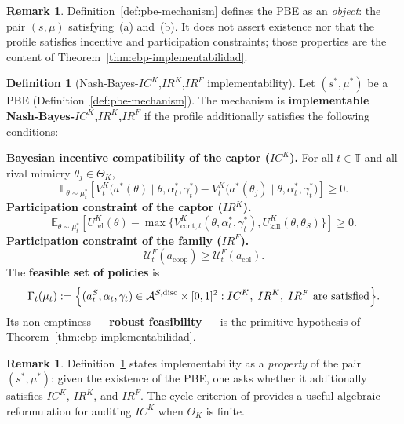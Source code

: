 \documentclass[ecta,nameyear,final,supplement]{econsocart}
\numberwithin{equation}{section}
\numberwithin{table}{section}
\theoremstyle{definition}
\newtheorem{definition}[theorem]{Definition}
\newtheorem{remark}[theorem]{Remark}
\begin{document}
\begin{remark}
Definition~\ref{def:pbe-mechanism} defines the PBE as an \emph{object}: the
pair $(s,\mu)$ satisfying~(a) and~(b). It does not assert existence nor that the
profile satisfies incentive and participation constraints; those properties are
the content of Theorem~\ref{thm:ebp-implementabilidad}.
\end{remark}

\bigskip

\begin{definition}[Nash-Bayes-$IC^K$,$IR^K$,$IR^F$ implementability]
\label{def:implementable-mechanism}
Let $(s^\ast,\mu^\ast)$ be a PBE (Definition~\ref{def:pbe-mechanism}). The
mechanism is \textbf{implementable Nash-Bayes-$IC^K$,$IR^K$,$IR^F$} if the
profile additionally satisfies the following conditions:

\smallskip
\noindent\textbf{Bayesian incentive compatibility of the captor ($IC^K$).}
For all $t\in\mathbb{T}$ and all rival mimicry $\theta_j\in\Theta_K$,
\[
\mathbb{E}_{\theta\sim\mu_t^\ast}
\!\left[
V^K_t\!\bigl(a^\ast(\theta)\mid\theta,\alpha_t^\ast,\gamma_t^\ast\bigr)
-V^K_t\!\bigl(a^\ast(\theta_j)\mid\theta,\alpha_t^\ast,\gamma_t^\ast\bigr)
\right]\ge 0.
\]
\noindent\textbf{Participation constraint of the captor ($IR^K$).}
\[
\mathbb{E}_{\theta\sim\mu_t^\ast}
\!\left[U^K_{\mathrm{rel}}(\theta)
-\max\bigl\{V^K_{\mathrm{cont},t}(\theta,\alpha_t^\ast,\gamma_t^\ast),
U^K_{\mathrm{kill}}(\theta,\theta_S)\bigr\}\right]\ge 0.
\]
\noindent\textbf{Participation constraint of the family ($IR^F$).}
\[
\mathcal{U}^F_t(a_{\mathrm{coop}})\ge\mathcal{U}^F_t(a_{\mathrm{col}}).
\]
The \textbf{feasible set of policies} is
\begin{equation}
\label{eq:gamma-factible}
\Gamma_t(\mu_t)
:=\Bigl\{(a_t^S,\alpha_t,\gamma_t)\in
\mathcal{A}^{S,\mathrm{disc}}\times[0,1]^2:
IC^K,\;IR^K,\;IR^F\text{ are satisfied}\Bigr\}.
\end{equation}
Its non-emptiness --- \textbf{robust feasibility} --- is the primitive
hypothesis of Theorem~\ref{thm:ebp-implementabilidad}.
\end{definition}

\begin{remark}
Definition~\ref{def:implementable-mechanism} states implementability as a
\emph{property} of the pair $(s^\ast,\mu^\ast)$: given the existence of the
PBE, one asks whether it additionally satisfies $IC^K$, $IR^K$, and $IR^F$. The
cycle criterion of \citet{Rochet1987} provides a useful algebraic
reformulation for auditing $IC^K$ when $\Theta_K$ is finite.
\end{remark}
\end{document}
